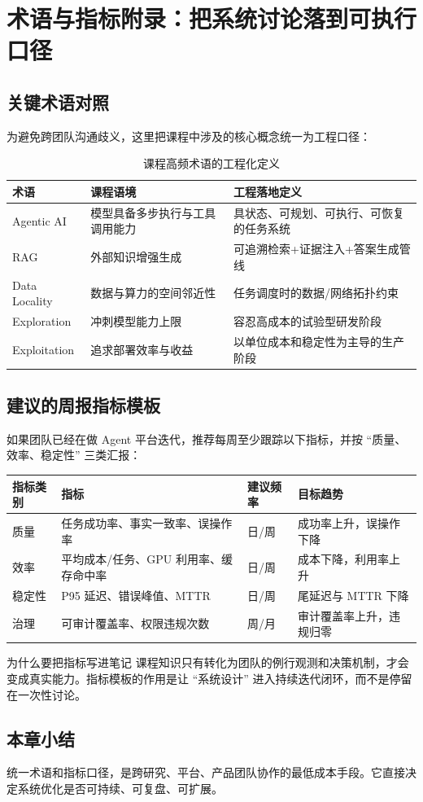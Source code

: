 \section{术语与指标附录：把系统讨论落到可执行口径}

\subsection{关键术语对照}
为避免跨团队沟通歧义，这里把课程中涉及的核心概念统一为工程口径：
\begin{table}[H]
\centering
\begin{tabular}{p{2.6cm}p{4.0cm}p{4.4cm}}
\toprule
\textbf{术语} & \textbf{课程语境} & \textbf{工程落地定义} \\
\midrule
Agentic AI & 模型具备多步执行与工具调用能力 & 具状态、可规划、可执行、可恢复的任务系统 \\
RAG & 外部知识增强生成 & 可追溯检索+证据注入+答案生成管线 \\
Data Locality & 数据与算力的空间邻近性 & 任务调度时的数据/网络拓扑约束 \\
Exploration & 冲刺模型能力上限 & 容忍高成本的试验型研发阶段 \\
Exploitation & 追求部署效率与收益 & 以单位成本和稳定性为主导的生产阶段 \\
\bottomrule
\end{tabular}
\caption{课程高频术语的工程化定义}
\end{table}

\subsection{建议的周报指标模板}
如果团队已经在做 Agent 平台迭代，推荐每周至少跟踪以下指标，并按 ``质量、效率、稳定性'' 三类汇报：
\begin{longtable}{p{2.8cm}p{3.8cm}p{2.7cm}p{3.0cm}}
\toprule
\textbf{指标类别} & \textbf{指标} & \textbf{建议频率} & \textbf{目标趋势} \\
\midrule
质量 & 任务成功率、事实一致率、误操作率 & 日/周 & 成功率上升，误操作下降 \\
效率 & 平均成本/任务、GPU 利用率、缓存命中率 & 日/周 & 成本下降，利用率上升 \\
稳定性 & P95 延迟、错误峰值、MTTR & 日/周 & 尾延迟与 MTTR 下降 \\
治理 & 可审计覆盖率、权限违规次数 & 周/月 & 审计覆盖率上升，违规归零 \\
\bottomrule
\end{longtable}

\begin{knowledgebox}{为什么要把指标写进笔记}
课程知识只有转化为团队的例行观测和决策机制，才会变成真实能力。指标模板的作用是让 ``系统设计'' 进入持续迭代闭环，而不是停留在一次性讨论。
\end{knowledgebox}

\subsection{本章小结}
统一术语和指标口径，是跨研究、平台、产品团队协作的最低成本手段。它直接决定系统优化是否可持续、可复盘、可扩展。


